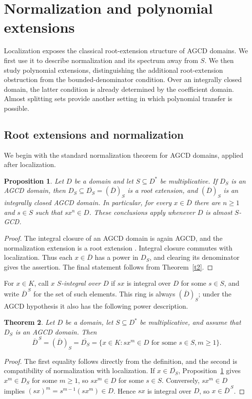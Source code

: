 \documentclass[11pt]{amsart}
\newtheorem{theorem}{Theorem}[section]
\newtheorem{proposition}[theorem]{Proposition}
\theoremstyle{definition}
\theoremstyle{remark}
\begin{document}
\section{Normalization and polynomial extensions}\label{sec:polynomial}

Localization exposes the classical root-extension structure of AGCD
domains. We first use it to describe normalization and its spectrum away
from $S$. We then study polynomial extensions, distinguishing the
additional root-extension obstruction from the bounded-denominator
condition. Over an integrally closed domain, the latter condition is
already determined by the coefficient domain. Almost splitting sets
provide another setting in which polynomial transfer is possible.

\subsection{Root extensions and normalization}

We begin with the standard normalization theorem for AGCD domains,
applied after localization.

\begin{proposition}\label{p:localized-root-extension}
Let $D$ be a domain and let $S\subseteq D^\ast$ be multiplicative.
If $D_S$ is an AGCD domain, then
$D_S\subseteq\overline{D_S}=(\overline D)_S$ is a root extension,
and $(\overline D)_S$ is an integrally closed AGCD domain.
In particular, for every $x\in\overline D$ there are $n\geq1$ and
$s\in S$ such that $sx^n\in D$. These conclusions apply whenever
$D$ is almost $S$-GCD.
\end{proposition}
\begin{proof}
The integral closure of an AGCD domain is again AGCD, and the
normalization extension is a root extension
\cite[Theorems~3.1 and~3.4]{Z3}. Integral closure commutes with
localization. Thus each $x\in\overline D$ has a power in $D_S$,
and clearing its denominator gives the assertion.
The final statement follows from Theorem~\ref{t2}.
\end{proof}

For $x\in K$, call $x$ \emph{$S$-integral over $D$} if $sx$ is
integral over $D$ for some $s\in S$, and write $\overline D^{\,S}$
for the set of such elements. This ring is always $(\overline D)_S$;
under the AGCD hypothesis it also has the following power description.

\begin{theorem}\label{t:S-integral-root-test}
Let $D$ be a domain, let $S\subseteq D^\ast$ be multiplicative,
and assume that $D_S$ is an AGCD domain. Then
\[
 \overline D^{\,S}=(\overline D)_S=\overline{D_S}
 =\{x\in K: sx^m\in D\text{ for some }s\in S, m\geq1\}.
\]
\end{theorem}
\begin{proof}
The first equality follows directly from the definition, and the
second is compatibility of normalization with localization.
If $x\in\overline{D_S}$, Proposition~\ref{p:localized-root-extension}
gives $x^m\in D_S$ for some $m\geq1$, so $sx^m\in D$ for some
$s\in S$. Conversely, $sx^m\in D$ implies
$(sx)^m=s^{m-1}(sx^m)\in D$. Hence $sx$ is integral over $D$,
so $x\in\overline D^{\,S}$.
\end{proof}
\end{document}
